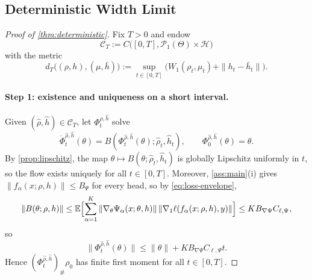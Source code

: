 \documentclass[11pt]{article}
\theoremstyle{definition}
\newcommand{\E}{\mathbb{E}}
\newcommand{\PP}{\mathcal{P}}
\newcommand{\W}{W_1}
\begin{document}
\subsection{Deterministic Width Limit}

\begin{proof}[Proof of \cref{thm:deterministic}]
Fix $T>0$ and endow
\[
  \mathcal C_T
  :=
  C\bigl([0,T],\PP_1(\Theta)\times\mathcal H\bigr)
\]
with the metric
\[
  d_T\bigl((\rho,h),(\mu,\bar h)\bigr)
  :=
  \sup_{t\in[0,T]}
  \bigl(
    \W(\rho_t,\mu_t)+\|h_t-\bar h_t\|
  \bigr).
\]

\paragraph{Step 1: existence and uniqueness on a short interval.}
Given $(\widehat\rho,\widehat h)\in\mathcal C_T$, let $\Phi_t^{\widehat\rho,\widehat h}$
solve
\[
  \dot\Phi_t^{\widehat\rho,\widehat h}(\theta)
  =
  B(\Phi_t^{\widehat\rho,\widehat h}(\theta);\widehat\rho_t,\widehat h_t),
  \qquad
  \Phi_0^{\widehat\rho,\widehat h}(\theta)=\theta.
\]
By \cref{prop:lipschitz}, the map
$\theta\mapsto B(\theta;\widehat\rho_t,\widehat h_t)$ is globally Lipschitz
uniformly in $t$, so the flow exists uniquely for all $t\in[0,T]$. Moreover,
\cref{ass:main}(i) gives
\(
  \|f_\alpha(x;\rho,h)\|\le B_\Psi
\)
for every head, so by \eqref{eq:loss-envelope},
\[
  \|B(\theta;\rho,h)\|
  \le
  \E\Bigl[
    \sum_{\alpha=1}^K
    \|\nabla_\theta\Psi_\alpha(x;\theta,h)\|\,
    \|\nabla_1\ell(f_\alpha(x;\rho,h),y)\|
  \Bigr]
  \le
  K B_{\nabla\Psi}C_{\ell,\Psi},
\]
so
\[
  \|\Phi_t^{\widehat\rho,\widehat h}(\theta)\|
  \le
  \|\theta\|+K B_{\nabla\Psi}C_{\ell,\Psi} t.
\]
Hence $(\Phi_t^{\widehat\rho,\widehat h})_\#\rho_0$ has finite first moment for
all $t\in[0,T]$.


\end{proof}
\end{document}
